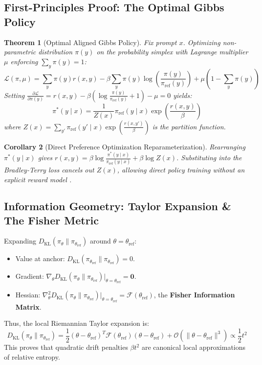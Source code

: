 \documentclass[11pt,a4paper]{article}
\theoremstyle{definition}
\theoremstyle{plain}
\newtheorem{theorem}{Theorem}[section]
\newtheorem{corollary}[theorem]{Corollary}
\theoremstyle{remark}
\newcommand{\KL}[2]{D_{\mathrm{KL}}\left(#1 \parallel #2\right)}
\begin{document}
\subsection{First-Principles Proof: The Optimal Gibbs Policy}
\begin{theorem}[Optimal Aligned Gibbs Policy]
Fix prompt $x$. Optimizing non-parametric distribution $\pi(y)$ on the probability simplex with Lagrange multiplier $\mu$ enforcing $\sum_y \pi(y) = 1$:
\begin{equation}
\mathcal{L}(\pi, \mu) = \sum_{y} \pi(y) r(x, y) - \beta \sum_{y} \pi(y) \log\left(\frac{\pi(y)}{\pi_{\mathrm{ref}}(y)}\right) + \mu \left( 1 - \sum_y \pi(y) \right)
\end{equation}
Setting $\frac{\partial \mathcal{L}}{\partial \pi(y)} = r(x, y) - \beta\left(\log\frac{\pi(y)}{\pi_{\mathrm{ref}}(y)} + 1\right) - \mu = 0$ yields:
\begin{equation}
\pi^*(y \mid x) = \frac{1}{Z(x)} \pi_{\mathrm{ref}}(y \mid x) \exp\left( \frac{r(x, y)}{\beta} \right)
\end{equation}
where $Z(x) = \sum_{y'} \pi_{\mathrm{ref}}(y' \mid x) \exp\left( \frac{r(x, y')}{\beta} \right)$ is the partition function.
\end{theorem}

\begin{corollary}[Direct Preference Optimization Reparameterization]
Rearranging $\pi^*(y \mid x)$ gives $r(x, y) = \beta \log \frac{\pi^*(y \mid x)}{\pi_{\mathrm{ref}}(y \mid x)} + \beta \log Z(x)$. Substituting into the Bradley-Terry loss cancels out $Z(x)$, allowing direct policy training without an explicit reward model \cite{rafailov2023direct}.
\end{corollary}

\subsection{Information Geometry: Taylor Expansion \& The Fisher Metric}
Expanding $\KL{\pi_\theta}{\pi_{\theta_{\mathrm{ref}}}}$ around $\theta = \theta_{\mathrm{ref}}$:
\begin{itemize}[noitemsep]
    \item Value at anchor: $\KL{\pi_{\theta_{\mathrm{ref}}}}{\pi_{\theta_{\mathrm{ref}}}} = 0$.
    \item Gradient: $\nabla_\theta \KL{\pi_\theta}{\pi_{\theta_{\mathrm{ref}}}} \big|_{\theta = \theta_{\mathrm{ref}}} = \mathbf{0}$.
    \item Hessian: $\nabla_\theta^2 \KL{\pi_\theta}{\pi_{\theta_{\mathrm{ref}}}} \big|_{\theta = \theta_{\mathrm{ref}}} = \mathcal{F}(\theta_{\mathrm{ref}})$, the \textbf{Fisher Information Matrix}.
\end{itemize}
Thus, the local Riemannian Taylor expansion is:
\begin{equation}
\KL{\pi_\theta}{\pi_{\theta_{\mathrm{ref}}}} = \frac{1}{2}(\theta - \theta_{\mathrm{ref}})^T \mathcal{F}(\theta_{\mathrm{ref}})(\theta - \theta_{\mathrm{ref}}) + \mathcal{O}(\|\theta - \theta_{\mathrm{ref}}\|^3) \propto \frac{1}{2} t^2
\end{equation}
This proves that quadratic drift penalties $\beta t^2$ are canonical local approximations of relative entropy.
\end{document}
